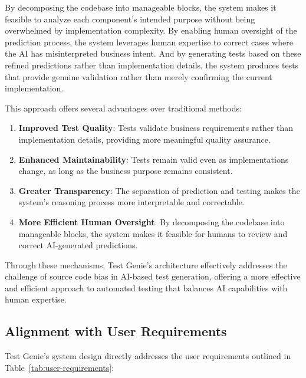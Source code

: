 \hspace{0.5cm}By decomposing the codebase into manageable blocks, the system makes it feasible to analyze each component's intended purpose without being overwhelmed by implementation complexity. By enabling human oversight of the prediction process, the system leverages human expertise to correct cases where the AI has misinterpreted business intent. And by generating tests based on these refined predictions rather than implementation details, the system produces tests that provide genuine validation rather than merely confirming the current implementation.

\hspace{0.5cm}This approach offers several advantages over traditional methods:

\begin{enumerate}
    \item \textbf{Improved Test Quality}: Tests validate business requirements rather than implementation details, providing more meaningful quality assurance.
    
    \item \textbf{Enhanced Maintainability}: Tests remain valid even as implementations change, as long as the business purpose remains consistent.
    
    \item \textbf{Greater Transparency}: The separation of prediction and testing makes the system's reasoning process more interpretable and correctable.
    
    \item \textbf{More Efficient Human Oversight}: By decomposing the codebase into manageable blocks, the system makes it feasible for humans to review and correct AI-generated predictions.
\end{enumerate}

\hspace{0.5cm}Through these mechanisms, Test Genie's architecture effectively addresses the challenge of source code bias in AI-based test generation, offering a more effective and efficient approach to automated testing that balances AI capabilities with human expertise.

\subsection{Alignment with User Requirements}

\hspace{0.5cm}Test Genie's system design directly addresses the user requirements outlined in Table~\ref{tab:user-requirements}:

